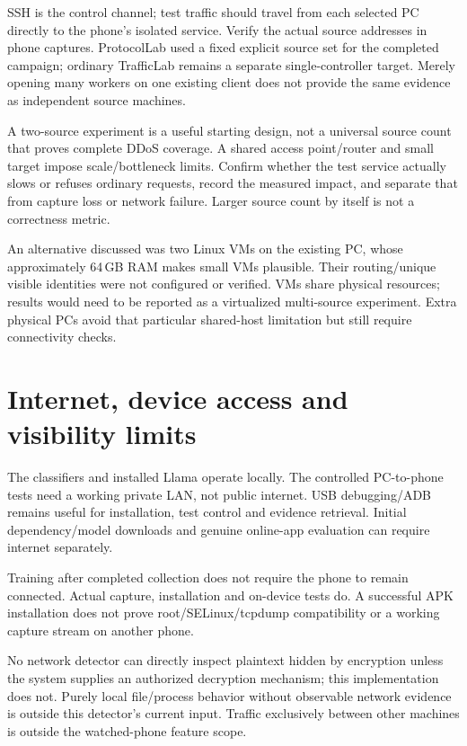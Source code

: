 \documentclass[11pt,a4paper,oneside]{report}
\begin{document}
SSH is the control channel; test traffic should travel from each selected PC directly to the phone's isolated service. Verify the actual source addresses in phone captures. ProtocolLab used a fixed explicit source set for the completed campaign; ordinary TrafficLab remains a separate single-controller target. Merely opening many workers on one existing client does not provide the same evidence as independent source machines.

A two-source experiment is a useful starting design, not a universal source count that proves complete DDoS coverage. A shared access point/router and small target impose scale/bottleneck limits. Confirm whether the test service actually slows or refuses ordinary requests, record the measured impact, and separate that from capture loss or network failure. Larger source count by itself is not a correctness metric.

An alternative discussed was two Linux VMs on the existing PC, whose approximately 64\,GB RAM makes small VMs plausible. Their routing/unique visible identities were not configured or verified. VMs share physical resources; results would need to be reported as a virtualized multi-source experiment. Extra physical PCs avoid that particular shared-host limitation but still require connectivity checks.

\section{Internet, device access and visibility limits}
The classifiers and installed Llama operate locally. The controlled PC-to-phone tests need a working private LAN, not public internet. USB debugging/ADB remains useful for installation, test control and evidence retrieval. Initial dependency/model downloads and genuine online-app evaluation can require internet separately.

Training after completed collection does not require the phone to remain connected. Actual capture, installation and on-device tests do. A successful APK installation does not prove root/SELinux/tcpdump compatibility or a working capture stream on another phone.

No network detector can directly inspect plaintext hidden by encryption unless the system supplies an authorized decryption mechanism; this implementation does not. Purely local file/process behavior without observable network evidence is outside this detector's current input. Traffic exclusively between other machines is outside the watched-phone feature scope.
\end{document}
